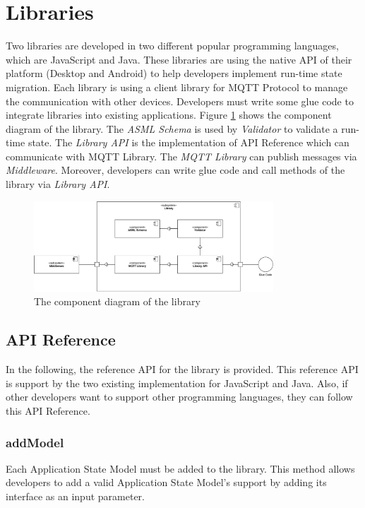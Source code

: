 \section{Libraries}
Two libraries are developed in two different popular programming languages, which are JavaScript and Java. These libraries are using the native API of their platform (Desktop and Android) to help developers implement run-time state migration. Each library is using a client library for MQTT Protocol to manage the communication with other devices. Developers must write some glue code to integrate libraries into existing applications. Figure \ref{fig:libraries-component} shows the component diagram of the library. The \textit{ASML Schema} is used by \textit{Validator} to validate a run-time state. The \textit{Library API} is the implementation of API Reference which can communicate with MQTT Library. The \textit{MQTT Library} can publish messages via \textit{Middleware}. Moreover, developers can write glue code and call methods of the library via \textit{Library API}.

\FloatBarrier
\begin{figure}[H]
    \includegraphics[width=0.8\textwidth]{../figures/libraries-diagram.pdf}
    \centering
    \caption{The component diagram of the library}
    \label{fig:libraries-component}
\end{figure}
\FloatBarrier

\subsection{API Reference}
In the following, the reference API for the library is provided. This reference API is support by the two existing implementation for JavaScript and Java. Also, if other developers want to support other programming languages, they can follow this API Reference. 

\subsubsection{addModel}
Each Application State Model must be added to the library. This method allows developers to add a valid Application State Model's support by adding its interface as an input parameter.

